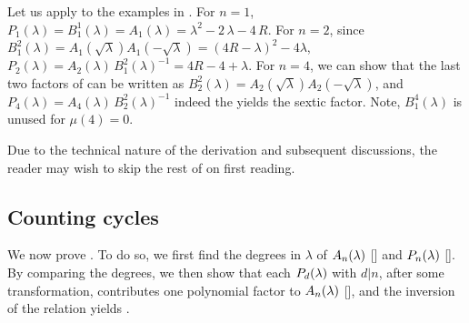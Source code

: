 \documentclass{ws-ijbc}
\begin{document}
%
Let us apply 
to the examples in .
For $n = 1$,
$P_1(\lambda) = B_1^1(\lambda) = A_1(\lambda)
  = \lambda^2 - 2\,\lambda - 4\,R$.
%
%
%
For $n = 2$, since
$B_1^2(\lambda)
=
A_1(\sqrt{\lambda})
A_1(-\sqrt{\lambda})
=
(4R-\lambda)^2 -4\lambda$,
%
$P_2(\lambda) = A_2(\lambda) \, B_1^2(\lambda)^{-1} = 4R - 4 + \lambda$.
%
%
For $n = 4$,
we can show that
the last two factors of 
can be written as
$B_2^2(\lambda) = A_2(\sqrt{\lambda}) A_2(-\sqrt{\lambda})$,
and
%
$P_4(\lambda)
    = A_4(\lambda) \, B_2^2(\lambda)^{-1}$
indeed the yields the sextic factor.
Note, $B_1^4(\lambda)$ is unused for $\mu(4) = 0$.






%
Due to the technical nature of the derivation and subsequent discussions,
  the reader may wish to skip the rest of 
  on first reading.






\subsection{\label{sec:degprimfac}Counting cycles}



%
We now prove .
%
To do so, we first find the degrees in $\lambda$ of
  $A_n(\lambda)$ [] and $P_n(\lambda)$ [].
By comparing the degrees,
  we then show that each $P_d(\lambda)$ with $d|n$,
  after some transformation,
  contributes one polynomial factor to $A_n(\lambda)$
  [],
  and the inversion of the relation
  yields .



\end{document}
